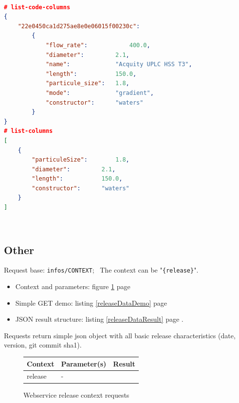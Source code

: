 ~\\
\begin{lstlisting}[language=json,caption={LC-MS Metadata JSON structure},label=lcmsMetadataResult]
# list-code-columns
{
	"22e0450ca1d275ae8e0e06015f00230c":
		{
			"flow_rate":			400.0,
			"diameter":			2.1,
			"name":				"Acquity UPLC HSS T3",
			"length":			150.0,
			"particule_size":	1.8,
			"mode":				"gradient",
			"constructor":		"waters"
		}
}
# list-columns
[
	{
		"particuleSize":		1.8,
		"diameter":			2.1,
		"length":			150.0,
		"constructor":		"waters"
	}
]
\end{lstlisting}
~\\

\subsection{Other}
\hspace*{\parindent}
Request base: \texttt{infos/CONTEXT};~
The context can be "\texttt{\{release\}}".
\begin{itemize}
	\item Context and parameters: \cf figure \ref{releaseInfosContexts} page \pageref{releaseInfosContexts}
	\item Simple GET demo: \cf listing \ref{releaseDataDemo} page \pageref{releaseDataDemo}
	\item JSON result structure: \cf listing \ref{releaseDataResult} page \pageref{releaseDataResult}. 
\end{itemize}
\hspace*{\parindent}
Requests return simple json object with all basic release characteristics (date, version, git commit sha1). 
\begin{figure}[htbp]
	\centering
	\footnotesize{
		\begin{minipage}{16.5 cm}
		\def\arraystretch{1}
		\begin{tabularx}{16cm}{|l|X|p{6cm}|}
			\hline	
			Context & Parameter(s) & Result \\ 
			\hline
			\hline
			release & - & \specialcell{basic release characteristics} \\ 
			\hline
		\end{tabularx} 
		\caption{Webservice release context requests}
		\label{releaseInfosContexts}
		\end{minipage}
	}%
\end{figure}
